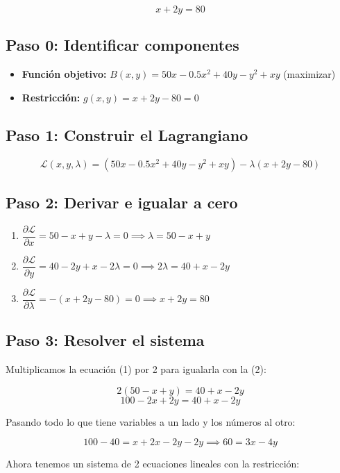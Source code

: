 \documentclass[12pt]{article}
\begin{document}
\[
x + 2y = 80
\]

\subsection{Paso 0: Identificar componentes}

\begin{itemize}
    \item \textbf{Función objetivo:} $B(x, y) = 50x - 0.5x^2 + 40y - y^2 + xy$ (maximizar)
    \item \textbf{Restricción:} $g(x, y) = x + 2y - 80 = 0$
\end{itemize}

\subsection{Paso 1: Construir el Lagrangiano}

\[
\mathcal{L}(x, y, \lambda) = (50x - 0.5x^2 + 40y - y^2 + xy) - \lambda(x + 2y - 80)
\]

\subsection{Paso 2: Derivar e igualar a cero}

\begin{enumerate}
    \item $\dfrac{\partial \mathcal{L}}{\partial x} = 50 - x + y - \lambda = 0 \implies \lambda = 50 - x + y$
    \item $\dfrac{\partial \mathcal{L}}{\partial y} = 40 - 2y + x - 2\lambda = 0 \implies 2\lambda = 40 + x - 2y$
    \item $\dfrac{\partial \mathcal{L}}{\partial \lambda} = -(x + 2y - 80) = 0 \implies x + 2y = 80$
\end{enumerate}

\subsection{Paso 3: Resolver el sistema}

Multiplicamos la ecuación (1) por 2 para igualarla con la (2):

\[
2(50 - x + y) = 40 + x - 2y
\]
\[
100 - 2x + 2y = 40 + x - 2y
\]

Pasando todo lo que tiene variables a un lado y los números al otro:

\[
100 - 40 = x + 2x - 2y - 2y \implies 60 = 3x - 4y
\]

Ahora tenemos un sistema de 2 ecuaciones lineales con la restricción:
\end{document}
